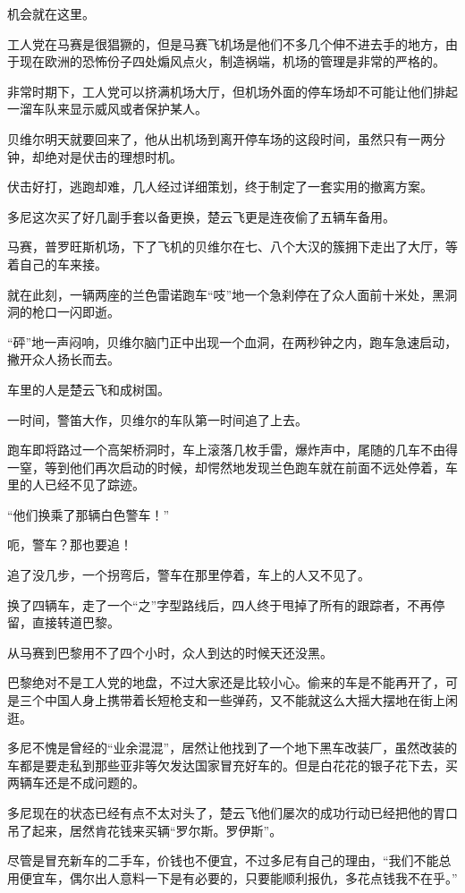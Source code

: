 机会就在这里。

工人党在马赛是很猖獗的，但是马赛飞机场是他们不多几个伸不进去手的地方，由于现在欧洲的恐怖份子四处煽风点火，制造祸端，机场的管理是非常的严格的。

非常时期下，工人党可以挤满机场大厅，但机场外面的停车场却不可能让他们排起一溜车队来显示威风或者保护某人。

贝维尔明天就要回来了，他从出机场到离开停车场的这段时间，虽然只有一两分钟，却绝对是伏击的理想时机。

伏击好打，逃跑却难，几人经过详细策划，终于制定了一套实用的撤离方案。

多尼这次买了好几副手套以备更换，楚云飞更是连夜偷了五辆车备用。

马赛，普罗旺斯机场，下了飞机的贝维尔在七、八个大汉的簇拥下走出了大厅，等着自己的车来接。

就在此刻，一辆两座的兰色雷诺跑车“吱”地一个急刹停在了众人面前十米处，黑洞洞的枪口一闪即逝。

“砰”地一声闷响，贝维尔脑门正中出现一个血洞，在两秒钟之内，跑车急速启动，撇开众人扬长而去。

车里的人是楚云飞和成树国。

一时间，警笛大作，贝维尔的车队第一时间追了上去。

跑车即将路过一个高架桥洞时，车上滚落几枚手雷，爆炸声中，尾随的几车不由得一窒，等到他们再次启动的时候，却愕然地发现兰色跑车就在前面不远处停着，车里的人已经不见了踪迹。

“他们换乘了那辆白色警车！”

呃，警车？那也要追！

追了没几步，一个拐弯后，警车在那里停着，车上的人又不见了。

换了四辆车，走了一个“之”字型路线后，四人终于甩掉了所有的跟踪者，不再停留，直接转道巴黎。

从马赛到巴黎用不了四个小时，众人到达的时候天还没黑。

巴黎绝对不是工人党的地盘，不过大家还是比较小心。偷来的车是不能再开了，可是三个中国人身上携带着长短枪支和一些弹药，又不能就这么大摇大摆地在街上闲逛。

多尼不愧是曾经的“业余混混”，居然让他找到了一个地下黑车改装厂，虽然改装的车都是要走私到那些亚非等欠发达国家冒充好车的。但是白花花的银子花下去，买两辆车还是不成问题的。

多尼现在的状态已经有点不太对头了，楚云飞他们屡次的成功行动已经把他的胃口吊了起来，居然肯花钱来买辆“罗尔斯。罗伊斯”。

尽管是冒充新车的二手车，价钱也不便宜，不过多尼有自己的理由，“我们不能总用便宜车，偶尔出人意料一下是有必要的，只要能顺利报仇，多花点钱我不在乎。”

